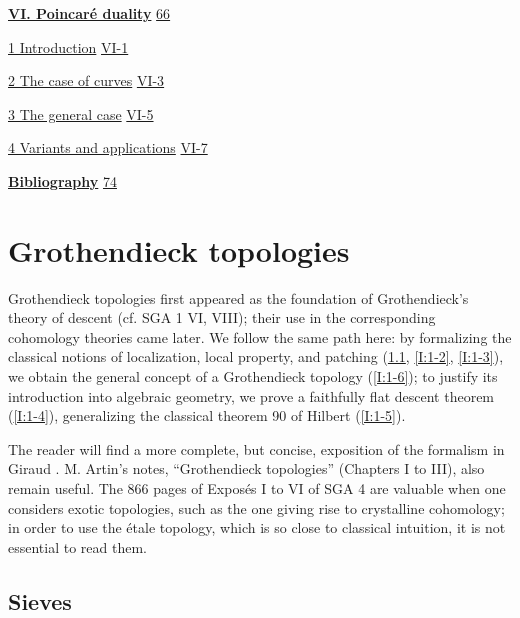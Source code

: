 \hyperref[I:6]{\textbf{VI. Poincaré duality}}\dotfill
  \hyperref[I:6]{66}\par
\hspace*{1.5em}\hyperref[I:6-1]{1 Introduction}\dotfill
  \hyperref[I:6-1]{VI-1}\par
\hspace*{1.5em}\hyperref[I:6-2]{2 The case of curves}\dotfill
  \hyperref[I:6-2]{VI-3}\par
\hspace*{1.5em}\hyperref[I:6-3]{3 The general case}\dotfill
  \hyperref[I:6-3]{VI-5}\par
\hspace*{1.5em}\hyperref[I:6-4]{4 Variants and applications}\dotfill
  \hyperref[I:6-4]{VI-7}\par

\hyperref[I:bib]{\textbf{Bibliography}}\dotfill
  \hyperref[I:bib]{74}\par
\endgroup

\newpage

\section{Grothendieck topologies}\label{I:1}

Grothendieck topologies first appeared as the foundation of Grothendieck's
theory of descent (cf. SGA 1 VI, VIII); their use in the corresponding
cohomology theories came later. We follow the same path here: by formalizing
the classical notions of localization, local property, and patching
(\ref{I:1-1}, \ref{I:1-2}, \ref{I:1-3}), we obtain the general concept of a
Grothendieck topology (\ref{I:1-6}); to justify its introduction into
algebraic geometry, we prove a faithfully flat descent theorem
(\ref{I:1-4}), generalizing the classical theorem 90 of Hilbert
(\ref{I:1-5}).

The reader will find a more complete, but concise, exposition of the
formalism in Giraud . M. Artin's notes, “Grothendieck
topologies”  (Chapters I to III), also remain useful. The
866 pages of Exposés I to VI of SGA 4 are valuable when one considers exotic
topologies, such as the one giving rise to crystalline cohomology; in order
to use the étale topology, which is so close to classical intuition, it is
not essential to read them.

\subsection{Sieves}\label{I:1-1}

